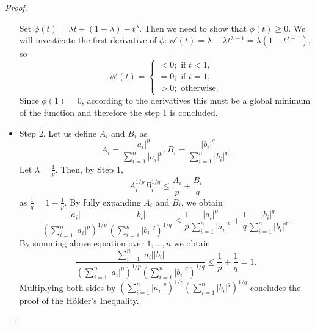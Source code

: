 \begin{theorem}
\begin{proof}
\begin{itemize}
			Set $\phi(t)=\lambda t + (1-\lambda)-t^{\lambda}$. Then we need to show that $\phi(t) \ge 0$. We will investigate the first derivative of $\phi$: $\phi'(t)=\lambda - \lambda t^{\lambda-1}=\lambda(1-t^{\lambda-1})$, so
			\begin{equation}
			\phi'(t)=
			\begin{cases}
			< 0; \text{ if } t < 1, \\
			= 0; \text{ if } t = 1, \\
			> 0; \text{ otherwise}.
			\end{cases}
			\end{equation}
			Since $\phi(1)=0$, according to the derivatives this must be a global minimum of the function and therefore the step 1 is concluded.
			\item Step 2. Let us define $A_i$ and $B_i$ as
			\begin{equation}
			A_i={\frac{|a_i|^p}{\sum_{i=1}^{n}|a_i|^p}},
			B_i = {\frac{|b_i|^q}{\sum_{i=1}^{n}|b_i|^q}}.
			\end{equation}
			Let $\lambda = \frac{1}{p}$. Then, by Step 1, 
			\begin{equation}
			A_i^{1/p}B_i^{1/q} \le \frac{A_i}{p}+\frac{B_i}{q}
			\end{equation}
			as $\frac{1}{q}=1-\frac{1}{p}$. By fully expanding $A_i$ and $B_i$, we obtain
			\begin{equation}
			{\frac{|a_i|}{{\left( \sum_{i=1}^{n}|a_i|^p \right)^{1/p}}}}
			{\frac{|b_i|}{{\left( \sum_{i=1}^{n}|b_i|^q \right)^{1/q}}}}
			\le
			\frac{1}{p}{\frac{|a_i|^p}{\sum_{i=1}^{n}|a_i|^p}}
			+ \frac{1}{q}{\frac{|b_i|^q}{\sum_{i=1}^{n}|b_i|^q}}.
			\end{equation}
			By summing above equation over $1, \dots ,n$ we obtain
			\begin{equation}
			{\frac{\sum_{i=1}^{n}|a_i||b_i|}{\left( \sum_{i=1}^{n} |a_i|^p \right)^{1/p}
					\left( \sum_{i=1}^{n} |b_i|^q \right)^{1/q}		
				}}
				\le \frac{1}{p}+ \frac{1}{q}=1.
				\end{equation}
				Multiplying both sides by $\left( \sum_{i=1}^{n} |a_i|^p \right)^{1/p}
				\left( \sum_{i=1}^{n} |b_i|^q \right)^{1/q}$ concludes the proof of the H\"older's Inequality.
			\end{itemize}
		\end{proof}
	\end{theorem}
	

